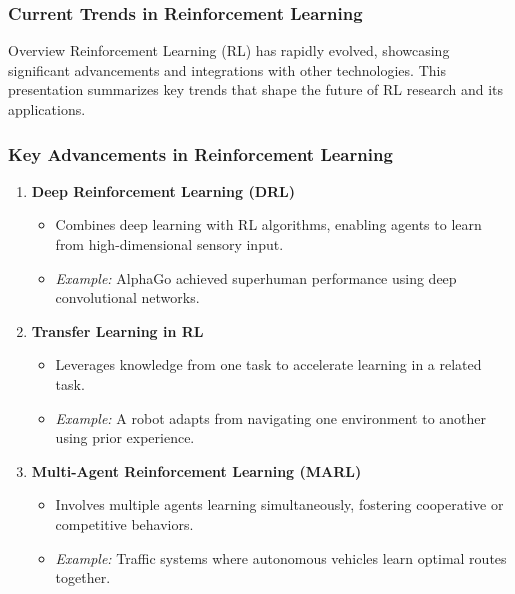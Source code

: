 \documentclass{beamer}
\begin{document}
\begin{frame}[fragile]
    \frametitle{Current Trends in Reinforcement Learning}
    \begin{block}{Overview}
        Reinforcement Learning (RL) has rapidly evolved, showcasing significant advancements and integrations with other technologies. 
        This presentation summarizes key trends that shape the future of RL research and its applications.
    \end{block}
\end{frame}

\begin{frame}[fragile]
    \frametitle{Key Advancements in Reinforcement Learning}
    \begin{enumerate}
        \item \textbf{Deep Reinforcement Learning (DRL)}
        \begin{itemize}
            \item Combines deep learning with RL algorithms, enabling agents to learn from high-dimensional sensory input.
            \item \textit{Example:} AlphaGo achieved superhuman performance using deep convolutional networks.
        \end{itemize}
        
        \item \textbf{Transfer Learning in RL}
        \begin{itemize}
            \item Leverages knowledge from one task to accelerate learning in a related task.
            \item \textit{Example:} A robot adapts from navigating one environment to another using prior experience.
        \end{itemize}
        
        \item \textbf{Multi-Agent Reinforcement Learning (MARL)}
        \begin{itemize}
            \item Involves multiple agents learning simultaneously, fostering cooperative or competitive behaviors.
            \item \textit{Example:} Traffic systems where autonomous vehicles learn optimal routes together.
        \end{itemize}
    \end{enumerate}
\end{frame}
\end{document}
